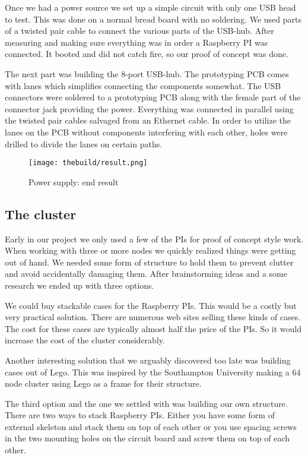 Once we had a power source we set up a simple circuit with only one USB head to test. This was done on a normal bread board with no soldering. We used parts of a twisted pair cable to connect the various parts of the USB-hub. After measuring and making sure everything was in order a Raspberry PI was connected. It booted and did not catch fire, so our proof of concept was done. 

The next part was building the 8-port USB-hub. The prototyping PCB comes with lanes which simplifies connecting the components somewhat. The USB connectors were soldered to a prototyping PCB along with the female part of the connector jack providing the power. Everything was connected in parallel using the twisted pair cables salvaged from an Ethernet cable. In order to utilize the lanes on the PCB without components interfering with each other, holes were drilled to divide the lanes on certain paths.   

\begin{figure}[h]
	\centering
    \texttt{[image: thebuild/result.png]}
    \caption{Power supply: end result}
    \label{fig:build_power_supply}
\end{figure}

\subsection{The cluster}
Early in our project we only used a few of the PIs for proof of concept style work. When working with three or more nodes we quickly realized things were getting out of hand. We needed some form of structure to hold them to prevent clutter and avoid accidentally damaging them. After brainstorming ideas and a some research we ended up with three options. 

We could buy stackable cases for the Raspberry PIs. This would be a costly but very practical solution. There are numerous web sites selling these kinds of cases. The cost for these cases are typically almost half the price of the PIs. So it would increase the cost of the cluster considerably.

Another interesting solution that we arguably discovered too late was building cases out of Lego. This was inspired by the Southampton University making a 64 node cluster using Lego as a frame for their structure.\cite{legos} 

The third option and the one we settled with was building our own structure. There are two ways to stack Raspberry PIs. Either you have some form of external skeleton and stack them on top of each other or you use spacing screws in the two mounting holes on the circuit board and screw them on top of each other. 

